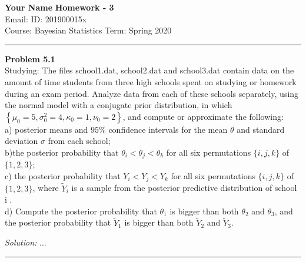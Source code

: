 \documentclass[a4paper, 11pt]{article}
\newenvironment{problem}[2][Problem]
    { \begin{mdframed}[backgroundcolor=gray!20] \textbf{#1 #2} \\}
    {  \end{mdframed}}
\newenvironment{solution}
    {\textit{Solution:}}
    {}
\begin{document}
\noindent
\large\textbf{Your Name} \hfill \textbf{Homework - 3}   \\
Email:               \hfill ID: 201900015x \\
\normalsize Course: Bayesian Statistics \hfill Term: Spring 2020\\
\noindent\rule{7in}{2.8pt}
\begin{problem}{5.1}
  Studying: The files school1.dat, school2.dat and school3.dat contain data on the amount of time students from three high schools spent on studying or homework during an exam period. Analyze data from each of these schools separately, using the normal model with a conjugate prior distribution, in which $\left\{\mu_{0}=5, \sigma_{0}^{2}=4, \kappa_{0}=1, \nu_{0}=2\right\}$, and compute or approximate the following:\\
  a) posterior means and $95\%$ confidence intervals for the mean $\theta$ and standard deviation $\sigma$ from each school;\\
  b)the posterior probability that $ \theta_{i}<\theta_{j}<\theta_{k}$ for all six permutations  $ \{i, j, k\}$ of $\{1,2,3\}$;\\
  c) the posterior probability that $ Y_{i}<Y_{j}<Y_{k}$ for all six permutations $ \{i, j, k\} $ of $\{1,2,3\}$,  where $ \tilde{Y}_{i}$  is a sample from the posterior predictive distribution of school  i . \\
  d) Compute the posterior probability that  $\theta_{1}$ is bigger than both $ \theta_{2}$ and  $\theta_{3}$, and the posterior probability that $ \tilde{Y}_{1}$ is bigger than both $ \tilde{Y}_{2}
  $ and $  \tilde{Y}_{3} $.
\end{problem}
\begin{solution}
...
\end{solution}

\noindent\rule{7in}{2.8pt}

\end{document}
